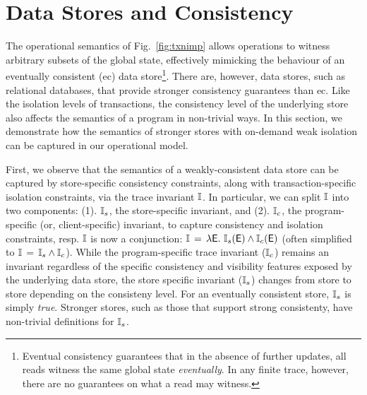 \section{Data Stores and Consistency}
\label{sec:store-consistency}

The operational semantics of Fig.~\ref{fig:txnimp} allows operations
to witness arbitrary subsets of the global state, effectively mimicking the
behaviour of an eventually consistent ({\sc ec}) data
store\footnote{Eventual consistency guarantees that in the absence of further
  updates, all reads witness the same global state
  \emph{eventually}. In any finite trace, however, there are no
  guarantees on what a read may witness.}. There are, however, data stores,
such as relational databases, that provide stronger consistency
guarantees than {\sc ec}. Like the isolation levels of transactions,
the consistency level of the underlying store also affects the
semantics of a program in non-trivial ways. In this section, we
demonstrate how the semantics of stronger stores with on-demand weak
isolation can be captured in our operational model. 


First, we observe that the semantics of a weakly-consistent data store
can be captured by store-specific consistency constraints, along with
transaction-specific isolation constraints, via the trace invariant
$\mathbb{I}$. In particular, we can split $\mathbb{I}$ into two components: (1).
$\mathbb{I}_s$, the store-specific invariant, and (2). $\mathbb{I}_c$, the
program-specific (or, client-specific) invariant, to capture
consistency and isolation constraints, resp.  $\mathbb{I}$ is now a
conjunction: $\mathbb{I} \,=\, \lambda\textsf{E}.~\mathbb{I}_s(\textsf{E}) \wedge \mathbb{I}_c(\textsf{E})$ (often
simplified to $\mathbb{I} \,=\, \mathbb{I}_s\wedge\mathbb{I}_c$).  While the program-specific
trace invariant ($\mathbb{I}_c$) remains an invariant regardless of the
specific consistency and visibility features exposed by the underlying
data store, the store specific invariant ($\mathbb{I}_s$) changes from store
to store depending on the consisteny level.  For an eventually
consistent store, $\mathbb{I}_s$ is simply \emph{true}. Stronger stores, such
as those that support strong consistenty, have non-trivial definitions
for $\mathbb{I}_s$.

